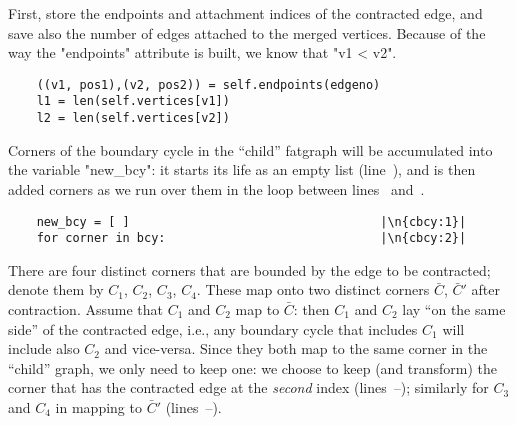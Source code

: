 First, store the endpoints and attachment indices of the contracted
edge, and save also the number of edges attached to the merged
vertices.  Because of the way the "endpoints" attribute is built, we
know that "v1 < v2".
\begin{lstlisting}
    ((v1, pos1),(v2, pos2)) = self.endpoints(edgeno)
    l1 = len(self.vertices[v1])
    l2 = len(self.vertices[v2])
\end{lstlisting}
Corners of the boundary cycle in the ``child'' fatgraph will be
accumulated into the variable "new_bcy": it starts its life as an
empty list (line~), and is then added corners as we run
over them in the loop between lines~ and~.
\begin{lstlisting}
    new_bcy = [ ]                                   |\n{cbcy:1}|
    for corner in bcy:                              |\n{cbcy:2}|
\end{lstlisting}

There are four distinct corners that are bounded by the edge to be
contracted; denote them by $C_1$, $C_2$, $C_3$, $C_4$.  These map onto
two distinct corners $\bar C$, $\bar C'$ after contraction.  Assume
that $C_1$ and $C_2$ map to $\bar C$: then $C_1$ and $C_2$ lay ``on
the same side'' of the contracted edge, i.e., any boundary cycle that
includes $C_1$ will include also $C_2$ and vice-versa.  Since they
both map to the same corner in the ``child'' graph, we only need to
keep one: we choose to keep (and transform) the corner that has the
contracted edge at the \emph{second} index
(lines~--); similarly for $C_3$ and $C_4$ in
mapping to $\bar C'$ (lines~--).

